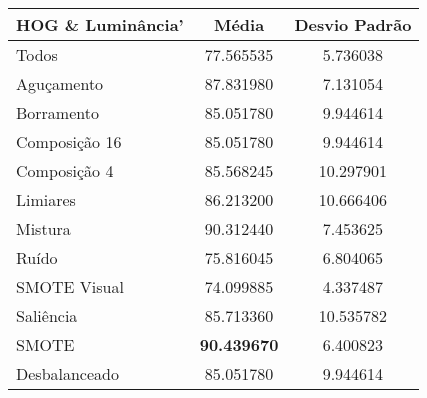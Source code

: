 \begin{table}[!htbp]
\centering
\caption{}
\label{tab:resultados:x:melhor}
\begin{tabular}{|l|c|c|}
\hline
\textbf{HOG  \& Luminância'} & \textbf{Média}     & \textbf{Desvio Padrão} \\ \hline
   Todos        &  77.565535  &  5.736038  \\ \hline
  Aguçamento    &  87.831980  &  7.131054  \\ \hline
  Borramento    &  85.051780  &  9.944614  \\ \hline
  Composição 16 &  85.051780  &  9.944614  \\ \hline
  Composição 4  &  85.568245 &  10.297901  \\ \hline
  Limiares      &  86.213200 &  10.666406  \\ \hline
  Mistura       &  90.312440  &  7.453625  \\ \hline
  Ruído         &  75.816045  &  6.804065  \\ \hline
  SMOTE Visual  &  74.099885  &  4.337487  \\ \hline
  Saliência     &  85.713360 &  10.535782  \\ \hline
 SMOTE          &  \textbf{90.439670}  &  6.400823  \\ \hline
Desbalanceado   &  85.051780  &  9.944614  \\ \hline
\end{tabular}
\end{table}



